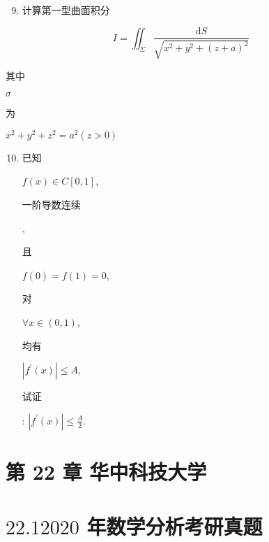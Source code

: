 \documentclass[10pt]{article}
\begin{document}
\begin{enumerate}
  \setcounter{enumi}{8}
  \item \begin{CJK}{UTF8}{mj}计算第一型曲面积分\end{CJK}
\end{enumerate}
$$
I=\iint_{\Sigma} \frac{\mathrm{d} S}{\sqrt{x^{2}+y^{2}+(z+a)^{2}}}
$$
\begin{CJK}{UTF8}{mj}其中\end{CJK} $\sigma$ \begin{CJK}{UTF8}{mj}为\end{CJK} $x^{2}+y^{2}+z^{2}=a^{2}(z>0)$

\begin{enumerate}
  \setcounter{enumi}{9}
  \item \begin{CJK}{UTF8}{mj}已知\end{CJK} $f(x) \in C[0,1]$, \begin{CJK}{UTF8}{mj}一阶导数连续\end{CJK}, \begin{CJK}{UTF8}{mj}且\end{CJK} $f(0)=f(1)=0$, \begin{CJK}{UTF8}{mj}对\end{CJK} $\forall x \in(0,1)$, \begin{CJK}{UTF8}{mj}均有\end{CJK} $\left|f^{\prime}(x)\right| \leq A$, \begin{CJK}{UTF8}{mj}试证\end{CJK}: $\left|f^{\prime}(x)\right| \leq \frac{A}{2}$.
\end{enumerate}
\section{第 22 章 华中科技大学}
\section{$22.12020$ 年数学分析考研真题}
\end{document}
